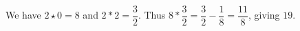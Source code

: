 We have $ 2\star0=8 $ and $ 2*2=\dfrac{3}{2}$. Thus $ 8*\dfrac{3}{2}=\dfrac{3}{2}-\dfrac{1}{8}=\dfrac{11}{8}$, giving $\boxed{19}$.

